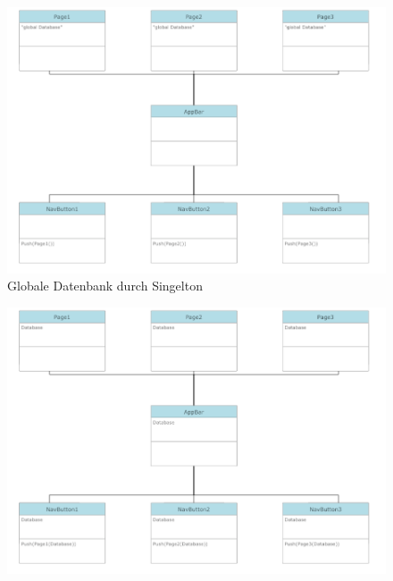 \begin{figure}
    \centering
    \includegraphics[width=1.1\textwidth]{res/global_database.png} 
    \caption{Globale Datenbank durch Singelton} 
    \label{pic:global_database}
\end{figure}
\begin{figure}
  \centering
  \includegraphics[width=1.1\linewidth]{res/weitergegebene_datasabe.png}
  \label{fig:weitergegebene_datasabe}
\end{figure}
